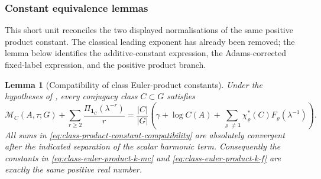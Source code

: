 \documentclass[11pt,a4paper]{amsart}
\theoremstyle{plain}
\newtheorem{lemma}[theorem]{Lemma}
\theoremstyle{definition}
\theoremstyle{remark}
\begin{document}
\subsubsection{Constant equivalence lemmas}

This short unit reconciles the two displayed normalisations of the same
positive product constant.  The classical leading exponent has already been
removed; the lemma below identifies the additive-constant expression, the
Adams-corrected fixed-label expression, and the positive product branch.

\begin{lemma}[Compatibility of class Euler-product constants]
  \label{lem:class-product-constant-equivalence}
  Under the hypotheses of , every
  conjugacy class \(C\subset G\) satisfies
  \begin{equation}\label{eq:class-product-constant-compatibility}
    \mathcal M_C(A,\tau;G)
    +\sum_{r\ge2}\frac{\Pi_{\mathbf1_C}(\lambda^{-r})}{r}
    =
    \frac{|C|}{|G|}
    \left(
      \gamma+\log C(A)
      +\sum_{\varrho\neq\mathbf1}
        \chi_\varrho^\ast(C)F_\varrho(\lambda^{-1})
    \right).
  \end{equation}
  All sums in \eqref{eq:class-product-constant-compatibility} are
  absolutely convergent after the indicated separation of the scalar
  harmonic term. Consequently the constants in
  \eqref{eq:class-euler-product-k-mc} and
  \eqref{eq:class-euler-product-k-f} are exactly the same positive real
  number.
\end{lemma}
\end{document}
